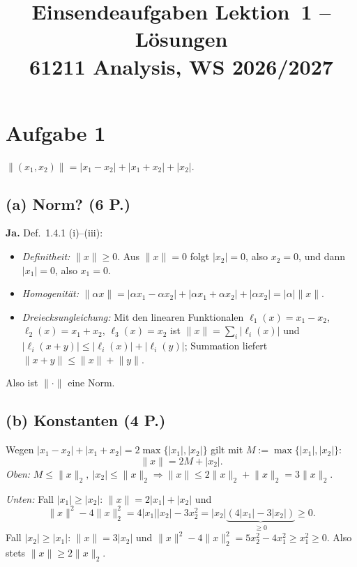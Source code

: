 \documentclass[11pt,a4paper]{article}
\title{Einsendeaufgaben Lektion~1 -- Lösungen\\[2pt]
\large 61211 Analysis, WS 2026/2027}
\date{}
\newcommand{\norm}[1]{\lVert #1 \rVert}
\newcommand{\abs}[1]{\lvert #1 \rvert}
\begin{document}
\maketitle
\vspace{-1.2cm}

\section*{Aufgabe 1}

\noindent
$\norm{(x_1,x_2)}=\abs{x_1-x_2}+\abs{x_1+x_2}+\abs{x_2}$.

\subsection*{(a) Norm? \hfill (6 P.)}
\textbf{Ja.} Def.~1.4.1 (i)--(iii):
\begin{itemize}[leftmargin=1.6em,itemsep=1pt]
\item \emph{Definitheit:} $\norm{x}\ge0$. Aus $\norm{x}=0$ folgt $\abs{x_2}=0$, also
$x_2=0$, und dann $\abs{x_1}=0$, also $x_1=0$.
\item \emph{Homogenität:} $\norm{\alpha x}=\abs{\alpha x_1-\alpha x_2}+\abs{\alpha x_1+\alpha x_2}+\abs{\alpha x_2}
=\abs{\alpha}\norm{x}$.
\item \emph{Dreiecksungleichung:} Mit den linearen Funktionalen
$\ell_1(x)=x_1-x_2$, $\ell_2(x)=x_1+x_2$, $\ell_3(x)=x_2$ ist
$\norm{x}=\sum_i\abs{\ell_i(x)}$ und
$\abs{\ell_i(x+y)}\le\abs{\ell_i(x)}+\abs{\ell_i(y)}$; Summation liefert
$\norm{x+y}\le\norm{x}+\norm{y}$.
\end{itemize}
Also ist $\norm{\cdot}$ eine Norm.

\subsection*{(b) Konstanten \hfill (4 P.)}
Wegen $\abs{x_1-x_2}+\abs{x_1+x_2}=2\max\{\abs{x_1},\abs{x_2}\}$ gilt mit
$M:=\max\{\abs{x_1},\abs{x_2}\}$:
\[
  \norm{x}=2M+\abs{x_2}.
\]
\emph{Oben:} $M\le\norm{x}_2,\ \abs{x_2}\le\norm{x}_2
\Rightarrow \norm{x}\le2\norm{x}_2+\norm{x}_2=3\norm{x}_2$.

\emph{Unten:} Fall $\abs{x_1}\ge\abs{x_2}$:
$\norm{x}=2\abs{x_1}+\abs{x_2}$ und
\[
  \norm{x}^2-4\norm{x}_2^2=4\abs{x_1}\abs{x_2}-3x_2^2
  =\abs{x_2}\underbrace{(4\abs{x_1}-3\abs{x_2})}_{\ge0}\ge0 .
\]
Fall $\abs{x_2}\ge\abs{x_1}$: $\norm{x}=3\abs{x_2}$ und
$\norm{x}^2-4\norm{x}_2^2=5x_2^2-4x_1^2\ge x_1^2\ge0$.
Also stets $\norm{x}\ge2\norm{x}_2$.
\end{document}
